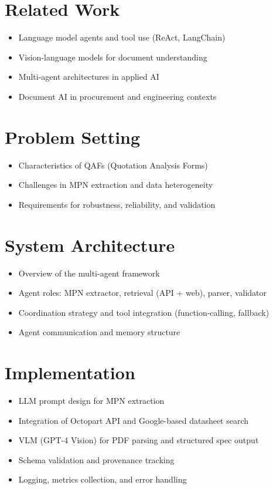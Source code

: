 \documentclass[11pt]{article}
\begin{document}
\section{Related Work}
\begin{itemize}
  \item Language model agents and tool use (ReAct, LangChain)
  \item Vision-language models for document understanding
  \item Multi-agent architectures in applied AI
  \item Document AI in procurement and engineering contexts
\end{itemize}

\section{Problem Setting}
\begin{itemize}
  \item Characteristics of QAFs (Quotation Analysis Forms)
  \item Challenges in MPN extraction and data heterogeneity
  \item Requirements for robustness, reliability, and validation
\end{itemize}

\section{System Architecture}
\begin{itemize}
  \item Overview of the multi-agent framework
  \item Agent roles: MPN extractor, retrieval (API + web), parser, validator
  \item Coordination strategy and tool integration (function-calling, fallback)
  \item Agent communication and memory structure
\end{itemize}

\section{Implementation}
\begin{itemize}
  \item LLM prompt design for MPN extraction
  \item Integration of Octopart API and Google-based datasheet search
  \item VLM (GPT-4 Vision) for PDF parsing and structured spec output
  \item Schema validation and provenance tracking
  \item Logging, metrics collection, and error handling
\end{itemize}
\end{document}

